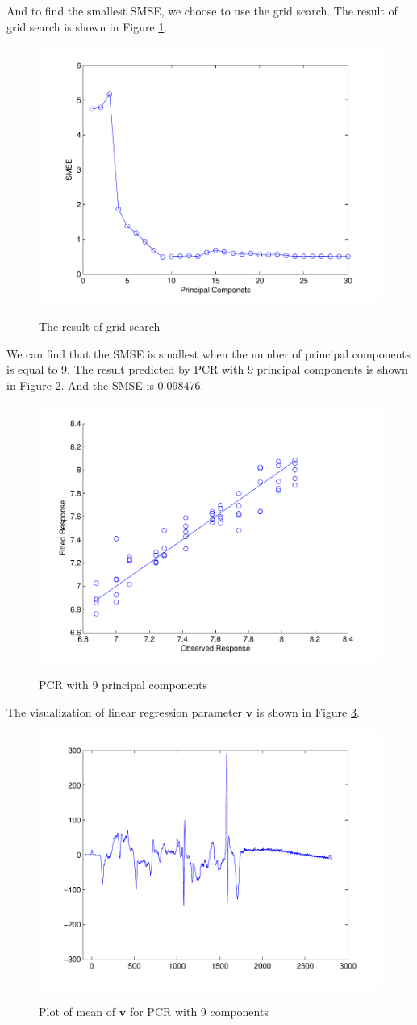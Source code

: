 \documentclass[a4paper]{article}
\newcommand{\bfv}{\mathbf{v}}
\begin{document}
And to find the smallest SMSE, we choose to use the grid search. The result of grid search is shown in Figure \ref{pcrb2}.
\begin{figure}[h]
  \centering
  \includegraphics[width=.6\textwidth]{images/gsearch_PCR.pdf}\\
  \caption{The result of grid search}\label{pcrb2}
\end{figure}

\newpage
We can find that the SMSE is smallest when the number of principal components is equal to 9. The result predicted by PCR with 9 principal components is shown in Figure \ref{pic4}. And the SMSE is 0.098476.
\begin{figure}[h]
  \centering
  \includegraphics[width=.6\textwidth]{images/predict_PCR.pdf}\\
  \caption{PCR with 9 principal components}\label{pic4}
\end{figure}

The visualization of linear regression parameter $\bfv$ is shown in Figure \ref{pic5}.
\begin{figure}[h]
  \centering
  \includegraphics[width=.6\textwidth]{images/v_PCR.pdf}\\
  \caption{Plot of mean of $\bfv$ for PCR with 9 components}\label{pic5}
\end{figure}
\end{document}
